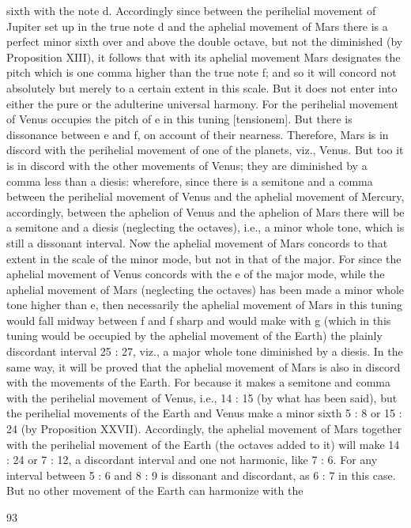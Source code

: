 \documentclass{article}
\begin{document}
sixth with the note d. Accordingly since between the perihelial
movement of Jupiter set up in the true note d and the aphelial movement
of Mars there is a perfect minor sixth over and above the double octave,
but not the diminished (by Proposition XIII), it follows that with its
aphelial movement Mars designates the pitch which is one comma
higher than the true note f; and so it will concord not absolutely but
merely to a certain extent in this scale. But it does not enter into either
the pure or the adulterine universal harmony. For the perihelial
movement of Venus occupies the pitch of e in this tuning [tensionem].
But there is dissonance between e and f, on account of their nearness.
Therefore, Mars is in discord with the perihelial movement of one of the
planets, viz., Venus. But too it is in discord with the other movements of
Venus; they are diminished by a comma less than a diesis: wherefore,
since there is a semitone and a comma between the perihelial movement
of Venus and the aphelial movement of Mercury, accordingly, between
the aphelion of Venus and the aphelion of Mars there will be a semitone
and a diesis (neglecting the octaves), i.e., a minor whole tone, which is
still a dissonant interval. Now the aphelial movement of Mars concords
to that extent in the scale of the minor mode, but not in that of the
major. For since the aphelial movement of Venus concords with the e of
the major mode, while the aphelial movement of Mars (neglecting the
octaves) has been made a minor whole tone higher than e, then
necessarily the aphelial movement of Mars in this tuning would fall
midway between f and f sharp and would make with g (which in this
tuning would be occupied by the aphelial movement of the Earth) the
plainly discordant interval 25 : 27, viz., a major whole tone diminished
by a diesis.
In the same way, it will be proved that the aphelial movement of Mars is
also in discord with the movements of the Earth. For because it makes a
semitone and comma with the perihelial movement of Venus, i.e., 14 : 15
(by what has been said), but the perihelial movements of the Earth and
Venus make a minor sixth 5 : 8 or 15 : 24 (by Proposition XXVII).
Accordingly, the aphelial movement of Mars together with the perihelial
movement of the Earth (the octaves added to it) will make 14 : 24 or 7 :
12, a discordant interval and one not harmonic, like 7 : 6. For any
interval between 5 : 6 and 8 : 9 is dissonant and discordant, as 6 : 7 in
this case. But no other movement of the Earth can harmonize with the


93
\end{document}
